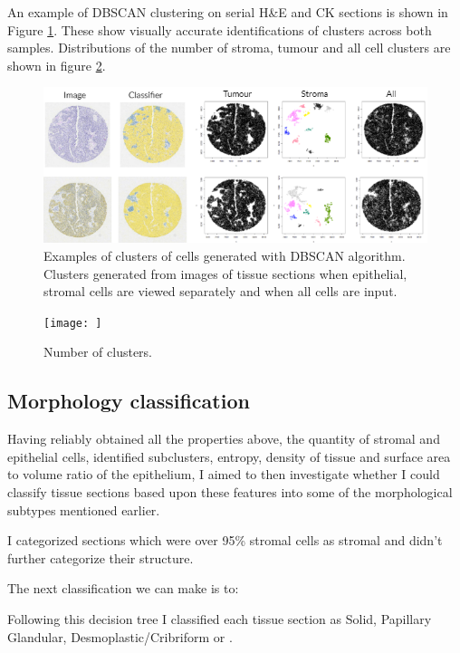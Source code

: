 An example of DBSCAN clustering on serial H\&E and CK sections is shown in Figure \ref{fig:dbclust}. These show visually accurate identifications of clusters across both samples. Distributions of the number of stroma, tumour and all cell clusters are shown in figure \ref{fig:dbscatter}.

\begin{figure}
    \centering
    \includegraphics[width=\textwidth]{Chapter3/Figs/dbscan_fullexample.png}
    \caption{Examples of clusters of cells generated with DBSCAN algorithm. Clusters generated from images of tissue sections when epithelial, stromal cells are viewed separately and when all cells are input.}
    \label{fig:dbclust}
\end{figure}

\begin{figure}
    \centering
    \texttt{[image: ]}
    \caption{Number of clusters.}
    \label{fig:dbscatter}
\end{figure}



\subsection{Morphology classification}
Having reliably obtained all the properties above, the quantity of stromal and epithelial cells, identified subclusters, entropy, density of tissue and surface area to volume ratio of the epithelium, I aimed to then investigate whether I could classify tissue sections based upon these features into some of the morphological subtypes mentioned earlier.

I categorized sections which were over 95\% stromal cells as stromal and didn't further categorize their structure. 

The next classification we can make is to:

Following this decision tree I classified each tissue section as Solid, Papillary Glandular, Desmoplastic/Cribriform or . 

